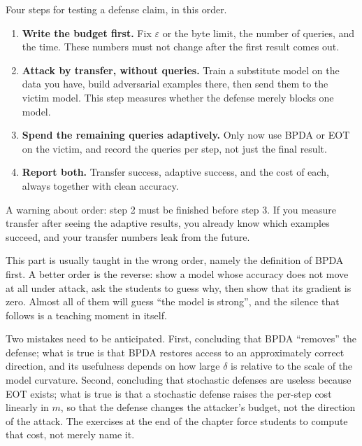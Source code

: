 \begin{resep}
Four steps for testing a defense claim, in this order.
\begin{enumerate}
  \item \textbf{Write the budget first.} Fix $\varepsilon$ or the byte limit,
        the number of queries, and the time. These numbers must not change after the first
        result comes out.
  \item \textbf{Attack by transfer, without queries.} Train a substitute model on the data
        you have, build adversarial examples there, then send them to the victim model.
        This step measures whether the defense merely blocks one model.
  \item \textbf{Spend the remaining queries adaptively.} Only now use BPDA or
        EOT on the victim, and record the queries per step, not just the final result.
  \item \textbf{Report both.} Transfer success, adaptive success, and the cost of each,
        always together with clean accuracy.
\end{enumerate}
A warning about order: step 2 must be finished before step 3. If you measure
transfer after seeing the adaptive results, you already know which examples succeed,
and your transfer numbers leak from the future.
\end{resep}



\begin{untukdosen}
This part is usually taught in the wrong order, namely the definition of BPDA first.
A better order is the reverse: show a model whose accuracy does not move at all
under attack, ask the students to guess why, then show that its gradient is
zero. Almost all of them will guess ``the model is strong'', and the silence that follows is a
teaching moment in itself.

Two mistakes need to be anticipated. First, concluding that BPDA ``removes''
the defense; what is true is that BPDA restores access to an approximately correct direction, and
its usefulness depends on how large $\delta$ is relative to the scale of the model curvature.
Second, concluding that stochastic defenses are useless because EOT exists; what is true is that
a stochastic defense raises the per-step cost linearly in $m$, so that the defense changes the
attacker's budget, not the direction of the attack. The exercises at the end of the chapter
force students to compute that cost, not merely name it.
\end{untukdosen}

